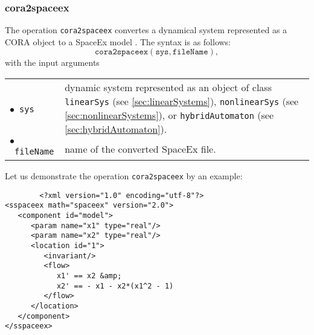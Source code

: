 \subsubsection{cora2spaceex} \label{sec:cora2spaceex}

The operation \texttt{cora2spaceex} convertes a dynamical system represented as a CORA object to a SpaceEx model \cite{Donze2013}. The syntax is as follows:
\begin{equation*}
	\texttt{cora2spaceex}(\texttt{sys},\texttt{fileName}),
\end{equation*} 
with the input arguments
\begin{center}
\renewcommand{\arraystretch}{1.3}
\begin{tabular}[t]{l p{13cm} }
	$\bullet$~\texttt{sys} &  dynamic system represented as an object of class \texttt{linearSys} (see \cref{sec:linearSystems}), \texttt{nonlinearSys} (see \cref{sec:nonlinearSystems}), or \texttt{hybridAutomaton} (see \cref{sec:hybridAutomaton}). \\
	$\bullet$~\texttt{fileName} & name of the converted SpaceEx file.
\end{tabular}
\end{center}

Let us demonstrate the operation \texttt{cora2spaceex} by an example:

\begin{center}
\begin{minipage}[t]{0.45\textwidth}
	\footnotesize
	
\end{minipage}
\begin{minipage}[t]{0.5\textwidth}
	\vspace{0pt}
	\centering
	\footnotesize
	\begin{verbatim}
		<?xml version="1.0" encoding="utf-8"?>
<sspaceex math="spaceex" version="2.0">
   <component id="model">
      <param name="x1" type="real"/>
      <param name="x2" type="real"/>
      <location id="1">
         <invariant/>
         <flow>
            x1' == x2 &amp; 
            x2' == - x1 - x2*(x1^2 - 1)
         </flow>
      </location>
   </component>
</sspaceex>
	\end{verbatim}
\end{minipage}
\end{center}
